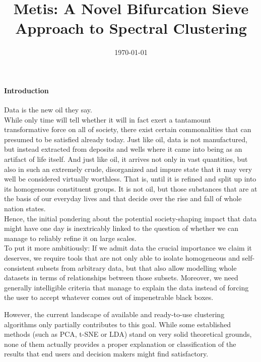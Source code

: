 \documentclass[10pt, a4paper, twocolumn]{article}
\title{Metis: A Novel Bifurcation Sieve Approach to Spectral Clustering}
\author{
\authorstyle{Florian Schaefer}
}
\date{\today}
\begin{document}
    \maketitle
    \thispagestyle{firstpage}

    \paragraph{Introduction}
    Data is the new oil they say.
    \\
    While only time will tell whether it will in fact exert a tantamount transformative force on all of society, there exist
    certain commonalities that can presumed to be satisfied already today.
    Just like oil, data is not manufactured, but instead extracted from deposits and wells where it came into being as an
    artifact of life itself.
    And just like oil, it arrives not only in vast quantities, but also in such an extremely crude, disorganized and impure
    state that it may very well be considered virtually worthless.
    That is, until it is refined and split up into its homogeneous constituent groups.
    It is not oil, but those substances that are at the basis of our everyday lives and that decide over the rise and fall
    of whole nation states.
    \\
    Hence, the initial pondering about the potential society-shaping impact that data might have one day is inextricably
    linked to the question of whether we can manage to reliably refine it on large scales.
    \\
    To put it more ambitiously: If we admit data the crucial importance we claim it deserves, we require tools that are
    not only able to isolate homogeneous and self-consistent subsets from arbitrary data, but that also allow modelling
    whole datasets in terms of relationships between those subsets.
    Moreover, we need generally intelligible criteria that manage to explain the data instead of forcing the user to
    accept whatever comes out of impenetrable black boxes.

    However, the current landscape of available and ready-to-use clustering algorithms only partially contributes to this goal.
    While some established methods (such as PCA, t-SNE or LDA) stand on very solid theoretical grounds, none of them
    actually provides a proper explanation or classification of the results that end users and decision makers might
    find satisfactory.
\end{document}
